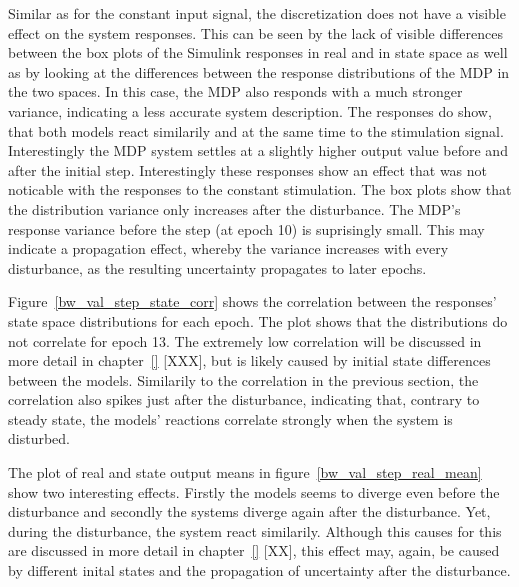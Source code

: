 Similar as for the constant input signal, the discretization does not have a visible effect on the system responses. This can be seen by the lack of visible differences between the box plots of the Simulink responses in real and in state space as well as by looking at the differences between the response distributions of the MDP in the two spaces. In this case, the MDP also responds with a much stronger variance, indicating a less accurate system description. The responses do show, that both models react similarily and at the same time to the stimulation signal. Interestingly the MDP system settles at a slightly higher output value before and after the initial step. Interestingly these responses show an effect that was not noticable with the responses to the constant stimulation. The box plots show that the distribution variance only increases after the disturbance. The MDP's response variance before the step (at epoch 10) is suprisingly small. This may indicate a propagation effect, whereby the variance increases with every disturbance, as the resulting uncertainty propagates to later epochs.

Figure~\ref{bw_val_step_state_corr} shows the correlation between the responses' state space distributions for each epoch. The plot shows that the distributions do not correlate for epoch 13. The extremely low correlation will be discussed in more detail in chapter~\ref{} [XXX], but is likely caused by initial state differences between the models. Similarily to the correlation in the previous section, the correlation also spikes just after the disturbance, indicating that, contrary to steady state, the models' reactions correlate strongly when the system is disturbed.

The plot of real and state output means in figure~\ref{bw_val_step_real_mean} show two interesting effects. Firstly the models seems to diverge even before the disturbance and secondly the systems diverge again after the disturbance. Yet, during the disturbance, the system react similarily. Although this causes for this are discussed in more detail in chapter~\ref{} [XX], this effect may, again, be caused by different inital states and the propagation of uncertainty after the disturbance.









